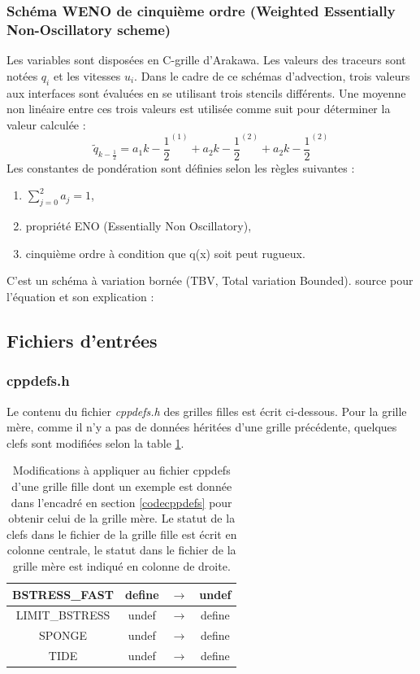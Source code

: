 \documentclass[10pt,a4paper,titlepage]{article}
\begin{document}
\subsubsection{Schéma WENO de cinquième ordre (Weighted Essentially Non-Oscillatory scheme)}\label{anx:WENO}
Les variables sont disposées en C-grille d'Arakawa.
Les valeurs des traceurs sont notées $q_i$ et les vitesses $u_i$.
Dans le cadre de ce schémas d'advection, trois valeurs aux interfaces sont évaluées en se utilisant trois stencils différents. Une moyenne non linéaire entre ces trois valeurs est utilisée comme suit pour déterminer la valeur calculée :
$$\tilde{q}_{k-\frac{1}{2}} = a_1k-\frac{1}{2}^{(1)} + a_2k-\frac{1}{2}^{(2)} + a_2k-\frac{1}{2}^{(2)}$$
Les constantes de pondération sont définies selon les règles suivantes :
\begin{enumerate}
    \item $\sum_{j=0}^{2}a_j = 1$,
    \item propriété ENO (Essentially Non Oscillatory),
    \item cinquième ordre à condition que q(x) soit peut rugueux.
\end{enumerate}
C'est un schéma à variation bornée (TBV, Total variation Bounded).
source pour l'équation et son explication : \cite{schemas_advection}


\subsection{Fichiers d'entrées}
\subsubsection{cppdefs.h}
\label{anx:cppdefs}
Le contenu du fichier \textit{cppdefs.h} des grilles filles est écrit ci-dessous. Pour la grille mère, comme il n'y a pas de données héritées d'une grille précédente, quelques clefs sont modifiées selon la table \ref{table:cppdefs_mere}.

\begin{table}[h!]
    \centering
    \begin{tabular}{c | c c c}
    BSTRESS\_FAST & define & $\rightarrow$ & {\color{red}undef}\\
    \hline
    LIMIT\_BSTRESS & undef & $\rightarrow$ & {\color{green}define}\\
    \hline
    SPONGE & undef & $\rightarrow$ & {\color{green}define}\\
    \hline
    TIDE & undef & $\rightarrow$ & {\color{green}define}\\
    \end{tabular}
    \caption{
    Modifications à appliquer au fichier cppdefs d'une grille fille dont un exemple est donnée dans l'encadré en section \ref{codecppdefs} pour obtenir celui de la grille mère.
    Le statut de la clefs dans le fichier de la grille fille est écrit en colonne centrale, le statut dans le fichier de la grille mère est indiqué en colonne de droite.
    }
    \label{table:cppdefs_mere}
\end{table}
\end{document}
